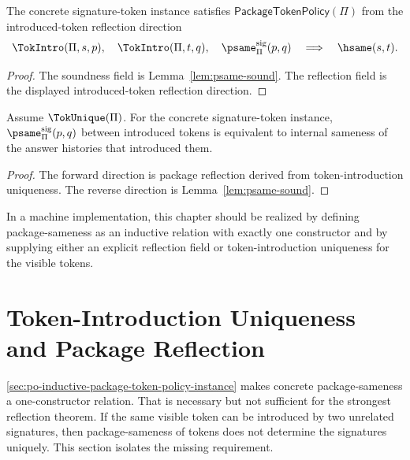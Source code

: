 \begin{theorem}
\label{thm:concrete-package-token-policy}
The concrete signature-token instance satisfies \(\mathsf{PackageTokenPolicy}(\Pi)\) from the introduced-token reflection direction
$$
  \TokIntro(\Pi,s,p),\quad \TokIntro(\Pi,t,q),\quad
  \psame_{\Pi}^{\mathrm{sig}}(p,q)
  \quad\Longrightarrow\quad
  \hsame(s,t).
$$
\end{theorem}

\begin{proof}
The soundness field is Lemma~\ref{lem:psame-sound}. The reflection field is the displayed introduced-token reflection direction.
\end{proof}

\begin{corollary}
\label{cor:exact-signature-package}
Assume \(\TokUnique(\Pi)\). For the concrete signature-token instance, \(\psame_{\Pi}^{\mathrm{sig}}(p,q)\) between introduced tokens is equivalent to internal sameness of the answer histories that introduced them.
\end{corollary}

\begin{proof}
The forward direction is package reflection derived from token-introduction uniqueness. The reverse direction is Lemma~\ref{lem:psame-sound}.
\end{proof}

\begin{remark}
In a machine implementation, this chapter should be realized by defining package-sameness as an inductive relation with exactly one constructor and by supplying either an explicit reflection field or token-introduction uniqueness for the visible tokens.
\end{remark}

\section{Token-Introduction Uniqueness and Package Reflection}
\label{sec:po-token-intro-uniqueness-policy}

\autoref{sec:po-inductive-package-token-policy-instance} makes concrete package-sameness a one-constructor relation. That is necessary but not sufficient for the strongest reflection theorem. If the same visible token can be introduced by two unrelated signatures, then package-sameness of tokens does not determine the signatures uniquely. This section isolates the missing requirement.

